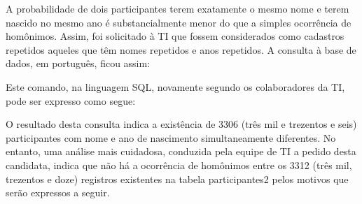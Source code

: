 \documentclass[
12pt,		%
openright,	%
twoside,  %
a4paper,			%
chapter=TITLE,		%
english,			%
french,				%
spanish,			%
brazil				%
]{USPSC-classe/USPSC}
\begin{document}
A probabilidade de dois participantes terem exatamente o mesmo nome e terem nascido no mesmo ano \'e substancialmente menor do que a simples ocorr\^encia de hom\^onimos. Assim, foi solicitado \`a TI que fossem considerados como cadastros repetidos aqueles que t\^em nomes repetidos e anos repetidos. A consulta \`a base de dados, em portugu\^es, ficou assim:















\noindent\begin{center}\mbox{\centering{}}\end{center}


Este comando, na linguagem SQL, novamente segundo os colaboradores da TI, pode ser expresso como segue:















\noindent\begin{center}\mbox{\centering{}}\end{center}


O resultado desta consulta indica a exist\^encia de 3306 (tr\^es mil e trezentos e seis) participantes com nome e ano de nascimento simultaneamente diferentes. No entanto, uma an\'alise mais cuidadosa, conduzida pela equipe de TI a pedido desta candidata, indica que n\~ao h\'a a ocorr\^encia de hom\^onimos entre os 3312 (tr\^es mil, trezentos e doze) registros existentes na tabela  participantes2 pelos motivos que ser\~ao expressos a seguir.
\end{document}
